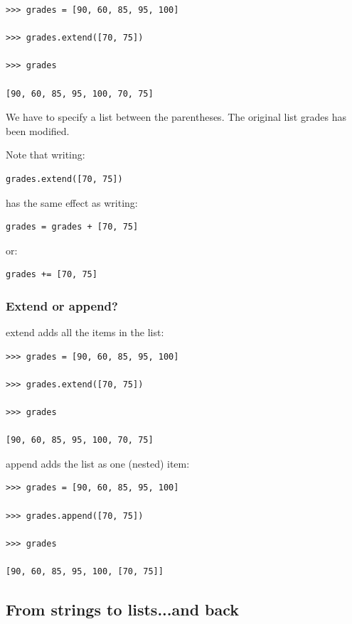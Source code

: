 \documentclass{article}
\begin{document}
\begin{lstlisting}
>>> grades = [90, 60, 85, 95, 100]

>>> grades.extend([70, 75])

>>> grades

[90, 60, 85, 95, 100, 70, 75]

\end{lstlisting}

We have to specify a list between the parentheses.  The original list grades has been modified. 

Note that writing:

\begin{lstlisting}
grades.extend([70, 75])
\end{lstlisting}

has the same effect as writing:

\begin{lstlisting}
grades = grades + [70, 75]
\end{lstlisting}

or:
\begin{lstlisting}
grades += [70, 75]
\end{lstlisting}

\subsubsection{Extend or append?}

extend adds all the items in the list: 

\begin{lstlisting}
>>> grades = [90, 60, 85, 95, 100]

>>> grades.extend([70, 75])

>>> grades

[90, 60, 85, 95, 100, 70, 75]

\end{lstlisting}

append adds the list as one (nested) item:

\begin{lstlisting}
>>> grades = [90, 60, 85, 95, 100]

>>> grades.append([70, 75])

>>> grades

[90, 60, 85, 95, 100, [70, 75]]

\end{lstlisting}

\subsection{From strings to lists...and back}
\end{document}
